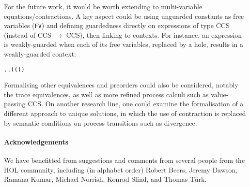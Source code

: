 For the future work, it would be worth extending
to multi-variable equations/contractions. A key aspect could be using unguarded constants as free variables
(\texttt{FV}) and defining guardedness directly on expressions of type CCS (instead of
CCS $\rightarrow$ CCS), then linking to contexts. For instance, an expression is weakly-guarded when each
of its free variables, replaced by a hole, results in a weakly-guarded context:
\begin{alltt}
\HOLTokenTurnstile{}   \HOLSymConst{\HOLTokenEquiv{}}
   \HOLSymConst{\HOLTokenForall{}}.  \HOLSymConst{\HOLTokenIn{}}   \HOLSymConst{\HOLTokenImp{}} \HOLSymConst{\HOLTokenForall{}}.   \HOLSymConst{\HOLTokenConj{}} ( ( ) \HOLSymConst{=} ) \HOLSymConst{\HOLTokenImp{}}  
\end{alltt}

Formalising other equivalences and preorders could also be considered,
notably the trace equivalences, as well as more refined process
calculi such as value-passing CCS.
%
On another research line, one could examine the formalisation of a different
approach \cite{DurierHS17} to unique
solutions, in which the use of contraction is
replaced by semantic conditions on process transitions such as
divergence. 



\paragraph{Acknowledgements}

We have benefitted from suggestions and comments 
from several people from the HOL
community, including (in alphabet order) Robert Beers, Jeremy Dawson,
Ramana Kumar,
Michael Norrish, 
Konrad Slind, and
Thomas T\"{u}rk.
%
